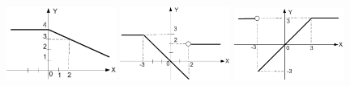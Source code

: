 \begin{figure}%
\begin{floatrow}[3]
{\includegraphics[width=0.32\textwidth,keepaspectratio]{img/ris_3_51}}
{\includegraphics[width=0.32\textwidth,keepaspectratio]{img/ris_3_52}}
{\includegraphics[width=0.32\textwidth,keepaspectratio]{img/ris_3_53}}
\end{floatrow}
\end{figure}%

